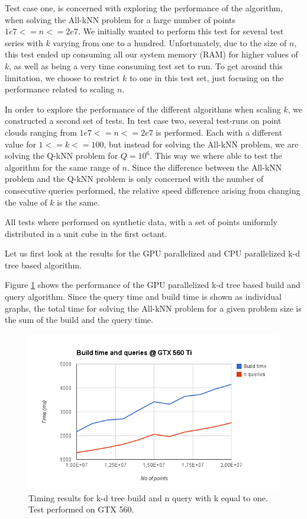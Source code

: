 Test case one, is concerned with exploring the performance of the algorithm, when solving the All-kNN problem for a large number of points $1e7<=n<=2e7$. We initially wanted to perform this test for several test series with $k$ varying from one to a hundred. Unfortunately, due to the size of $n$, this test ended up consuming all our system memory (RAM) for higher values of $k$, as well as being a very time consuming test set to run. To get around this limitation, we choose to restrict $k$ to one in this test set, just focusing on the performance related to scaling $n$.

In order to explore the performance of the different algorithms when scaling $k$, we constructed a second set of tests. In test case two, several test-runs on point clouds ranging from $1e7<=n<=2e7$ is performed. Each with a different value for $1<=k<=100$, but instead for solving the All-kNN problem, we are solving the Q-kNN problem for $Q=10^6$. This way we where able to test the algorithm for the same range of $n$. Since the difference between the All-kNN problem and the Q-kNN problem is only concerned with the number of consecutive queries performed, the relative speed difference arising from changing the value of $k$ is the same.

All tests where performed on synthetic data, with a set of points uniformly distributed in a unit cube in the first octant.

Let us first look at the results for the GPU parallelized and CPU parallelized k-d tree based algorithm.

Figure \ref{fig:v17-gtx-560} shows the performance of the GPU parallelized k-d tree based build and query algorithm. Since the query time and build time is shown as individual graphs, the total time for solving the All-kNN problem for a given problem size is the sum of the build and the query time.

\begin{figure}[ht!]
    \centering
    \includegraphics[width=120mm]{../gfx/v17-gtx-560.png}
    \caption{Timing results for k-d tree build and n query with k equal to one. Test performed on GTX 560.}
    \label{fig:v17-gtx-560}
\end{figure}

